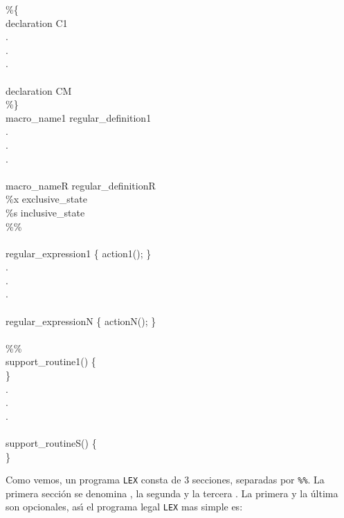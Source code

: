 \begin{tt}
\noindent \%\{              \\
declaration C1              \\
.\\
.\\
.\\                   \\
declaration CM              \\
\%\}              \\
macro\_name1 regular\_definition1                  \\
.\\
.\\
.\\                       \\
macro\_nameR regular\_definitionR                  \\

\noindent \%x exclusive\_state\\
\%s inclusive\_state\\
\%\%              \\
              \\
regular\_expression1 \{ action1(); \}              \\
.\\
.\\
.\\              \\
regular\_expressionN \{ actionN(); \}              \\
              \\
\%\%              \\
support\_routine1() \{              \\
\}              \\
.\\
.\\
.\\              \\
support\_routineS() \{              \\
\}              \\
\end{tt}

Como vemos,  un programa \verb|LEX| consta de 3 secciones, separadas
por \verb|%%|. La primera secci\'on se denomina ,
la segunda  
y la tercera . 
La primera y la \'ultima son opcionales, as\'{\i} el programa legal \verb|LEX| mas simple es:

